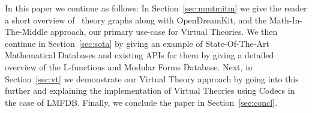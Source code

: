 In this paper we continue as follows:
In Section~\ref{sec:mmtmitm} we give the reader a short overview of \omdocmmt\ theory graphs along with OpenDreamKit, and the Math-In-The-Middle approach, our primary use-case for Virtual Theories. 
We then continue in Section~\ref{sec:sota} by giving an example of State-Of-The-Art Mathematical Databases and existing APIs for them by giving a detailed overview of the L-functions and Modular Forms Database. 
Next, in Section~\ref{sec:vt} we demonstrate our Virtual Theory approach by going into this further and explaining the implementation of Virtual Theories using Codecs in the case of LMFDB. 
Finally, we conclude the paper in Section~\ref{sec:concl}. 


